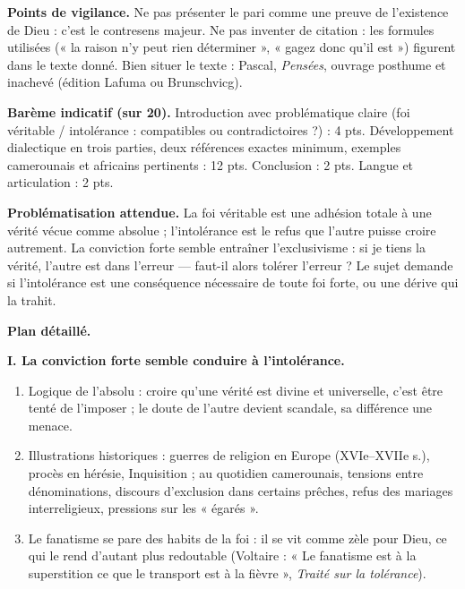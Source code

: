 \documentclass[11pt]{article}
\begin{document}
\begin{corrige}
\textbf{Points de vigilance.} Ne pas présenter le pari comme une preuve de l'existence de Dieu : c'est le contresens majeur. Ne pas inventer de citation : les formules utilisées (« la raison n'y peut rien déterminer », « gagez donc qu'il est ») figurent dans le texte donné. Bien situer le texte : Pascal, \emph{Pensées}, ouvrage posthume et inachevé (édition Lafuma ou Brunschvicg).
\end{corrige}

\begin{corrige}
\textbf{Barème indicatif (sur 20).} Introduction avec problématique claire (foi véritable / intolérance : compatibles ou contradictoires ?) : 4 pts. Développement dialectique en trois parties, deux références exactes minimum, exemples camerounais et africains pertinents : 12 pts. Conclusion : 2 pts. Langue et articulation : 2 pts.

\textbf{Problématisation attendue.} La foi véritable est une adhésion totale à une vérité vécue comme absolue ; l'intolérance est le refus que l'autre puisse croire autrement. La conviction forte semble entraîner l'exclusivisme : si je tiens la vérité, l'autre est dans l'erreur — faut-il alors tolérer l'erreur ? Le sujet demande si l'intolérance est une conséquence nécessaire de toute foi forte, ou une dérive qui la trahit.

\textbf{Plan détaillé.}

\textbf{I. La conviction forte semble conduire à l'intolérance.}
\begin{enumerate}
\item Logique de l'absolu : croire qu'une vérité est divine et universelle, c'est être tenté de l'imposer ; le doute de l'autre devient scandale, sa différence une menace.
\item Illustrations historiques : guerres de religion en Europe (XVIe–XVIIe s.), procès en hérésie, Inquisition ; au quotidien camerounais, tensions entre dénominations, discours d'exclusion dans certains prêches, refus des mariages interreligieux, pressions sur les « égarés ».
\item Le fanatisme se pare des habits de la foi : il se vit comme zèle pour Dieu, ce qui le rend d'autant plus redoutable (Voltaire : « Le fanatisme est à la superstition ce que le transport est à la fièvre », \emph{Traité sur la tolérance}).
\end{enumerate}


\end{corrige}
\end{document}
